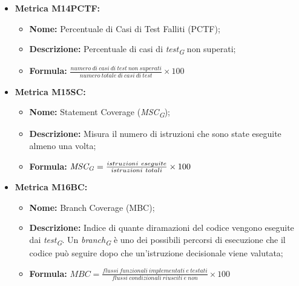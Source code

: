 \begin{itemize}
    \vspace{0.4cm}
    \item \hypertarget{item:M14PCTF}{\textbf{Metrica M14PCTF:}}
    \vspace{0.2cm}

    \begin{minipage}[H]{0.9\textwidth}
        \begin{itemize}
           \item \textbf{Nome:} Percentuale di Casi di Test Falliti (PCTF);
           \item \textbf{Descrizione:} Percentuale di casi di \textit{test}\textsubscript{\textit{G}} non superati;
           \item \textbf{Formula:} $\frac{numero \ di \ casi \ di \ test \ non \ superati}{numero \ totale \ di \ casi \ di \ test}\times 100$
        \end{itemize}
    \end{minipage}

    \vspace{0.4cm}
    \item \hypertarget{item:M15SC}{\textbf{Metrica M15SC:}}
    \vspace{0.2cm}

    \begin{minipage}[H]{0.9\textwidth}
        \begin{itemize}
            \item \textbf{Nome:} Statement Coverage (\textit{MSC}\textsubscript{\textit{G}});
            \item \textbf{Descrizione:} Misura il numero di istruzioni che sono state eseguite almeno una volta;
            \item \textbf{Formula:} $\textit{MSC}\textsubscript{\textit{G}} = \frac{istruzioni \ eseguite}{istruzioni \ totali} \times 100$
        \end{itemize}
    \end{minipage}

    \pagebreak
    \item \hypertarget{item:M16BC}{\textbf{Metrica M16BC:}}
    \vspace{0.2cm}

    \begin{minipage}[H]{0.9\textwidth}
        \begin{itemize}
            \item \textbf{Nome:} Branch Coverage (MBC);
            \item \textbf{Descrizione:} Indice di quante diramazioni del codice vengono eseguite dai \textit{test}\textsubscript{\textit{G}}. Un \textit{branch}\textsubscript{\textit{G}} è uno dei possibili percorsi di esecuzione che il codice può seguire dopo che un'istruzione decisionale viene valutata;
            \item \textbf{Formula:} $MBC = \frac{flussi \ funzionali \ implementati \ e \ testati}{flussi \ condizionali \ riusciti \ e \ non} \times 100$
        \end{itemize}
    \end{minipage}


\end{itemize}
